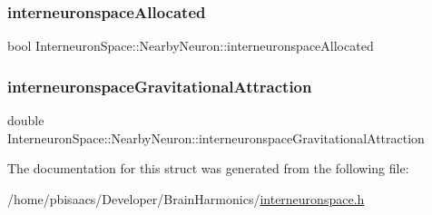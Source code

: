 \subsubsection{\texorpdfstring{interneuronspace\+Allocated}{interneuronspaceAllocated}}
{\footnotesize\ttfamily bool Interneuron\+Space\+::\+Nearby\+Neuron\+::interneuronspace\+Allocated}

\mbox{\label{structInterneuronSpace_1_1NearbyNeuron_a5cb224a1735249e1e50b934bdfd2ff3f}} 
\subsubsection{\texorpdfstring{interneuronspace\+Gravitational\+Attraction}{interneuronspaceGravitationalAttraction}}
{\footnotesize\ttfamily double Interneuron\+Space\+::\+Nearby\+Neuron\+::interneuronspace\+Gravitational\+Attraction}



The documentation for this struct was generated from the following file\+:\begin{DoxyCompactItemize}
\item 
/home/pbisaacs/\+Developer/\+Brain\+Harmonics/\mbox{\hyperlink{interneuronspace_8h}{interneuronspace.\+h}}\end{DoxyCompactItemize}
